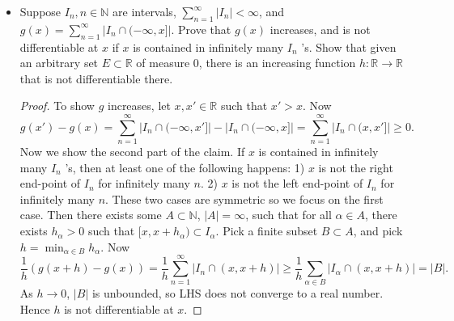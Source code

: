 \begin{itemize}
\begin{proof}
	\textbf{Step 2.} By linearity, this statement extends to $u$ being a simple function.

	\textbf{Step 3.} Consider $u \in L(\mathbb{R}, \mathcal{M}, m)$, $u \ge 0$. There exists a monotone increasing sequence of simple functions $u_n \ge 0$ that converges pointwise to $u$. For each $u_n$ we can define a corresponding $v_n \in L(\mathbb{R}, \mathcal{B}, \mu)$. By MCT, $v_n$ converge to some $v \in L(\mathbb{R}, \mathcal{B}, \mu)$. Let $E_n  = \{x: u_n(x) \neq v_n(x)\} $. Then  $m(E_n) = 0$. Thus $m\left( \bigcup_{n = 1} ^\infty  E_n \right)  = 0$. For any $x \in \mathbb{R} \setminus \bigcup_{n = 1} ^\infty $, we have
	\[
		v(x) = \lim v_n(x) = \lim u_n(x) = u(x)
	.\] 
	Hence $v = u$ a.e.

	\textbf{Step 4.} Consider $u \in L(\mathbb{R}, \mathcal{M}, m)$. We may split into positive and negative parts, $u = u^+ - u^-$. Apply step 3 to both parts, we obtain  $v^+$ and $v^-$ a.e. equal to $u^+$ and $u^-$, respectively. Define $v := v^+ - v^-$. Then
	\[
		|u-v| \le |u^+ - v^+| + |u^- - v^-|
	.\] 
	For almost every $x$, the RHS is zero. Hence $u = v$ a.e.
\end{proof}

\item Suppose $I_n, n \in \mathbb{N}$ are intervals, $\sum_{n=1}^{\infty} |I_n| < \infty $, and $g(x)= \sum_{n=1}^{\infty} \left| I_n \cap (-\infty , x] \right| $. Prove that $g(x) $ increases, and is not differentiable at $x$ if $x$ is contained in infinitely many $I_n$ 's. Show that given an arbitrary set $E \subset \mathbb{R}$ of measure $ 0$, there is an increasing function $h: \mathbb{R} \to \mathbb{R}$ that is not differentiable there.
\begin{proof}
	To show $g$ increases, let $x, x' \in  \mathbb{R}$ such that $x' > x$. Now
	\[
		g(x') - g(x) = \sum_{n=1}^\infty |I_n \cap ( - \infty , x']| - |I_n \cap (-\infty , x]| = \sum_{n=1}^\infty  |I_n \cap (x, x']| \ge  0
	.\] 
	Now we show the second part of the claim. If $x$ is contained in infinitely many $I_n$ 's, then at least one of the following happens: 1) $x$ is not the right end-point of $I_n$ for infinitely many $n$. 2) $x$ is not the left end-point of $I_n$ for infinitely many $n$. These two cases are symmetric so we focus on the first case. Then there exists some $A \subset \mathbb{N}$, $|A| = \infty $, such that for all $\alpha \in A$, there exists  $h_\alpha > 0$ such that $[x, x+h_\alpha) \subset I_\alpha$. Pick a finite subset $B \subset A$, and pick $h = \min_{\alpha \in B} h_\alpha$. Now
	\[
		\frac{1}{h} \left( g(x+h) - g(x) \right) = \frac{1}{h} \sum_{n = 1}^\infty \left| I_n \cap (x, x+h) \right|  \ge \frac{1}{h} \sum_{\alpha \in B} \left| I_\alpha \cap (x, x+h) \right|  = |B|
	.\] 
	As $h\to 0$, $|B|$ is unbounded, so LHS does not converge to a real number. Hence $h$ is not differentiable at $x$.


\end{proof}
\end{itemize}
